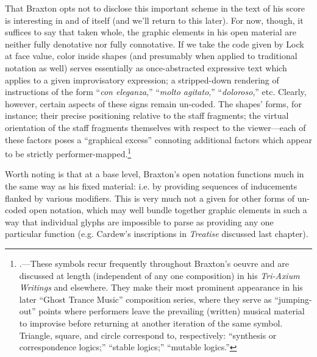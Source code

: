         That Braxton opts not to disclose this important scheme in the text of his score is interesting in and of itself (and we'll return to this later). For now, though, it suffices to say that taken whole, the graphic elements in his open material are neither fully denotative nor fully connotative. If we take the code given by Lock at face value, color inside shapes (and presumably when applied to traditional notation as well) serves essentially as once-abstracted expressive text which applies to a given improvisatory expression; a stripped-down rendering of instructions of the form ``\textit{con eleganza},'' ``\textit{molto agitato},'' ``\textit{doloroso},'' etc. Clearly, however, certain aspects of these signs remain un-coded. The shapes' forms, for instance; their precise positioning relative to the staff fragments; the virtual orientation of the staff fragments themselves with respect to the viewer---each of these factors poses a ``graphical excess'' connoting additional factors which appear to be strictly performer-mapped.\footnote{\autocite{Dicker_2016}.---These symbols recur frequently throughout Braxton's oeuvre and are discussed at length (independent of any one composition) in his \textit{Tri-Axium Writings} and elsewhere. They make their most prominent appearance in his later ``Ghost Trance Music'' composition series, where they serve as ``jumping-out'' points where performers leave the prevailing (written) musical material to improvise before returning at another iteration of the same symbol. Triangle, square, and circle correspond to, respectively: ``synthesis or correspondence logics;'' ``stable logics;'' ``mutable logics.''}
    
        Worth noting is that at a base level, Braxton's open notation functions much in the same way as his fixed material: i.e. by providing sequences of inducements flanked by various modifiers. This is very much not a given for other forms of un-coded open notation, which may well bundle together graphic elements in such a way that individual glyphs are impossible to parse as providing any one particular function (e.g. Cardew's inscriptions in \textit{Treatise} discussed last chapter).


